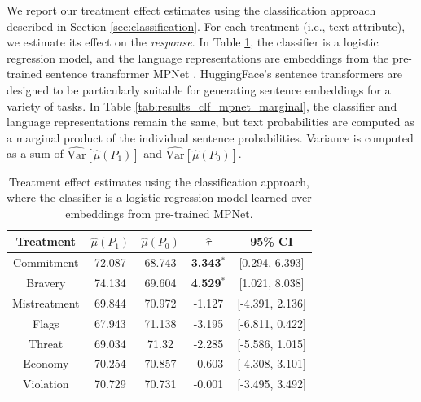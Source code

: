\documentclass{article}
\begin{document}
We report our treatment effect estimates using the classification approach described in Section \ref{sec:classification}. For each treatment (i.e., text attribute), we estimate its effect on the \textit{response}. In Table \ref{tab:results_clf_mpnet}, the classifier is a logistic regression model, and the language representations are embeddings from the pre-trained sentence transformer MPNet \cite{song2020mpnet}. HuggingFace's sentence transformers are designed to be particularly suitable for generating sentence embeddings for a variety of tasks. In Table \ref{tab:results_clf_mpnet_marginal}, the classifier and language representations remain the same, but text probabilities are computed as a marginal product of the individual sentence probabilities. Variance is computed as a sum of $\widehat{\text{Var}}[\hat{\mu}(P_1)]$ and $\widehat{\text{Var}}[\hat{\mu}(P_0)]$.

\begin{table}[!ht]
    \centering
    \begin{tabular}{c|cccc}
        \toprule
        Treatment & $\hat{\mu}(P_1)$ & $\hat{\mu}(P_0)$ & $\hat{\tau}$ & 95\% CI \\
        \midrule
        Commitment & 72.087 & 68.743 & \textbf{\textcolor{green!50!black}{3.343$^*$}} & [0.294, 6.393] \\
        Bravery & 74.134 & 69.604 & \textbf{\textcolor{green!50!black}{4.529$^*$}} & [1.021, 8.038] \\
        Mistreatment & 69.844 & 70.972 & \textcolor{red!80!black}{-1.127} & [-4.391, 2.136] \\
        Flags & 67.943 & 71.138 & \textcolor{red!80!black}{-3.195} & [-6.811, 0.422] \\
        Threat & 69.034 & 71.32 & \textcolor{red!80!black}{-2.285} & [-5.586, 1.015]  \\
        Economy & 70.254 & 70.857 & \textcolor{red!80!black}{-0.603} & [-4.308, 3.101] \\
        Violation & 70.729 & 70.731 & \textcolor{red!80!black}{-0.001} & [-3.495, 3.492] \\
        \bottomrule
    \end{tabular}
    \caption{Treatment effect estimates using the classification approach, where the classifier is a logistic regression model learned over embeddings from pre-trained MPNet.}
    \label{tab:results_clf_mpnet}
\end{table}
\end{document}
